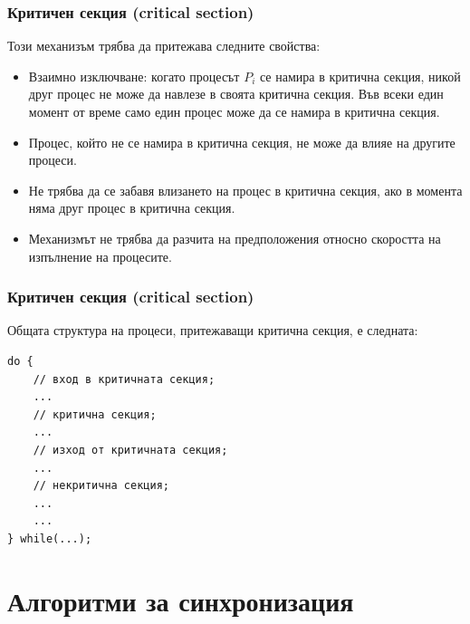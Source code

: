 \documentclass[ignorenonframetext, hyperref=unicode]{beamer}
\begin{document}
\begin{frame}[containsverbatim]
\frametitle{Критичен секция (critical section)}
Този механизъм трябва да притежава следните свойства:
  \begin{itemize}
    \item Взаимно изключване: когато процесът $P_i$ се намира в критична секция,
    никой друг процес не може да навлезе в своята критична секция. Във всеки
    един момент от време само един процес може да се намира в критична секция.
    \item Процес, който не се намира в критична секция, не може да влияе на
    другите процеси.
    \item Не трябва да се забавя влизането на процес в критична секция, ако в
    момента няма друг процес в критична секция.
    \item Механизмът не трябва да разчита на предположения относно скоростта на
    изпълнение на процесите.
  \end{itemize}
\end{frame}

\begin{frame}[containsverbatim]
\frametitle{Критичен секция (critical section)}
Общата структура на процеси, притежаващи критична секция, е следната:
\begin{lstlisting}
do {
	// вход в критичната секция;
	...
	// критична секция;
	...
	// изход от критичната секция;
	...
	// некритична секция;
	...
	...
} while(...);
\end{lstlisting}
\end{frame}

\section{Алгоритми за синхронизация}
\end{document}
